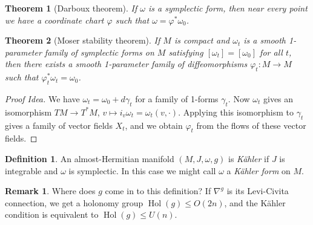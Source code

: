 \documentclass{article}
\newtheorem*{theorem}{Theorem}
\theoremstyle{definition}
\newtheorem*{definition}{Definition}
\newtheorem*{remark}{Remark}
\DeclareMathOperator{\Hol}{Hol}
\begin{document}
\begin{theorem}[Darboux theorem]
    If $\omega$ is a symplectic form, then near every point we have a coordinate
    chart $\varphi$ such that $\omega=\varphi^*\omega_0$.
\end{theorem}

\begin{theorem}[Moser stability theorem]
    If $M$ is compact and $\omega_t$ is a smooth 1-parameter family of
    symplectic forms on $M$ satisfying $[\omega_t]=[\omega_0]$ for all $t$, then
    there exists a smooth 1-parameter family of diffeomorphisms
    $\varphi_t:M\to M$ such that $\varphi_t^*\omega_t=\omega_0$.
\end{theorem}

\begin{proof}[Proof Idea]
    We have $\omega_t=\omega_0+d\gamma_t$ for a family of 1-forms $\gamma_t$.
    Now $\omega_t$ gives an isomorphism $TM\to T^*M$,
    $v\mapsto i_v\omega_t=\omega_t(v,\cdot)$. Applying this isomorphism to
    $\gamma_t$ gives a family of vector fields $X_t$, and we obtain $\varphi_t$
    from the flows of these vector fields.
\end{proof}

\begin{definition}
    An almost-Hermitian manifold $(M,J,\omega,g)$ is \emph{K\"ahler} if $J$ is
    integrable and $\omega$ is symplectic. In this case we might call $\omega$ a
    \emph{K\"ahler form} on $M$.
\end{definition}

\begin{remark}
    Where does $g$ come in to this definition? If $\nabla^g$ is its Levi-Civita
    connection, we get a holonomy group $\Hol(g)\le O(2n)$, and the K\"ahler
    condition is equivalent to $\Hol(g)\le U(n)$.
\end{remark}
\end{document}

